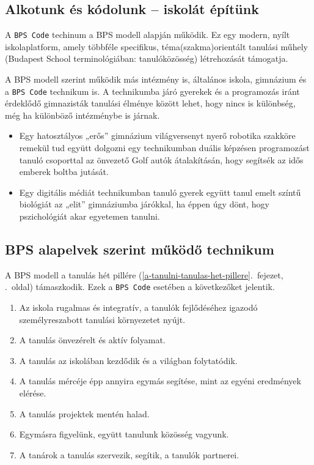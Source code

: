 \hypertarget{alkotunk-es-kodolunk-iskolat-epitunk}{%
\subsection{Alkotunk és kódolunk -- iskolát
építünk}\label{alkotunk-es-kodolunk-iskolat-epitunk}}

A \texttt{BPS\ Code} techinum a BPS modell alapján működik. Ez egy
modern, nyílt iskolaplatform, amely többféle specifikus,
téma(szakma)orientált tanulási műhely (Budapest School terminológiában:
tanulóközösség) létrehozását támogatja.

A BPS modell szerint működik más intézmény is, általános iskola,
gimnázium és a \texttt{BPS\ Code} technikum is. A technikumba járó
gyerekek és a programozás iránt érdeklődő gimnazisták tanulási élménye
között lehet, hogy nincs is különbség, még ha különböző intézménybe is
járnak.

\begin{itemize}
\tightlist
\item
  Egy hatosztályos „erős'' gimnázium világversenyt nyerő robotika
  szakköre remekül tud együtt dolgozni egy technikumban duális képzésen
  programozást tanuló csoporttal az önvezető Golf autók átalakításán,
  hogy segítsék az idős emberek boltba jutását.
\item
  Egy digitális médiát technikumban tanuló gyerek együtt tanul emelt
  színtű biológiát az „elit'' gimnáziumba járókkal, ha éppen úgy dönt,
  hogy pszichológiát akar egyetemen tanulni.
\end{itemize}

\hypertarget{bps-alapelvek-szerint-mukodo-technikum}{%
\subsection{BPS alapelvek szerint működő
technikum}\label{bps-alapelvek-szerint-mukodo-technikum}}

A BPS modell a
tanulás hét pillére (\ref{a-tanulni-tanulas-het-pillere}.~fejezet, \pageref{a-tanulni-tanulas-het-pillere}.~oldal)
támaszkodik. Ezek a \texttt{BPS\ Code} esetében a következőket jelentik.

\begin{enumerate}
\def\labelenumi{\arabic{enumi}.}
\tightlist
\item
  Az iskola rugalmas és integratív, a tanulók fejlődéséhez igazodó
  személyreszabott tanulási környezetet nyújt.
\item
  A tanulás önvezérelt és aktív folyamat.
\item
  A tanulás az iskolában kezdődik és a világban folytatódik.
\item
  A tanulás mércéje épp annyira egymás segítése, mint az egyéni
  eredmények elérése.
\item
  A tanulás projektek mentén halad.
\item
  Egymásra figyelünk, együtt tanulunk közösség vagyunk.
\item
  A tanárok a tanulás szervezik, segítik, a tanulók partnerei.
\end{enumerate}

